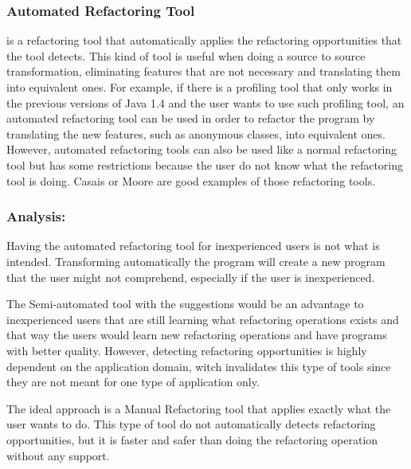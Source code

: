 \subsubsection{Automated Refactoring Tool}
is a refactoring tool that automatically applies the refactoring opportunities that the tool detects. 
This kind of tool is useful when doing a source to source transformation, eliminating features that are not necessary and translating them into equivalent ones. 
For example, if there is a profiling tool that only works in the previous versions of Java 1.4 and the user wants to use such profiling tool, an automated refactoring tool can be used in order to refactor the program by translating the new features, such as anonymous classes, into equivalent ones.
However, automated refactoring tools can also be used like a normal refactoring tool but has some restrictions because the user do not know what the refactoring tool is doing.
Casais \cite{casais1994automatic} or Moore \cite{moore1996automatic} are good examples of those refactoring tools.





\subsubsection{Analysis:}
Having the automated refactoring tool for inexperienced users is not what is intended. 
Transforming automatically the program will create a new program that the user might not comprehend, especially if the user is inexperienced.

The Semi-automated tool with the suggestions would be an advantage to inexperienced users that are still learning what refactoring operations exists and that way the users would learn new refactoring operations and have programs with better quality.
However, detecting refactoring opportunities is highly dependent on the application domain, witch invalidates this type of tools since they are not meant for one type of application only.

The ideal approach is a Manual Refactoring tool that applies exactly what the user wants to do. 
This type of tool do not automatically detects refactoring opportunities, but it is faster and safer than doing the refactoring operation without any support.